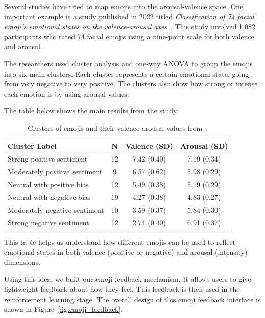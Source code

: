 Several studies have tried to map emojis into the arousal-valence space. One important example is a study published in 2022 titled \textit{Classification of 74 facial emoji’s emotional states on the valence-arousal axes}~\cite{kutsuzawa2022classification}. This study involved 1,082 participants who rated 74 facial emojis using a nine-point scale for both valence and arousal.

The researchers used cluster analysis and one-way ANOVA to group the emojis into six main clusters. Each cluster represents a certain emotional state, going from very negative to very positive. The clusters also show how strong or intense each emotion is by using arousal values.

The table below shows the main results from the study:

\begin{table}[h]
    \centering
    \begin{tabular}{|l|c|c|c|}
        \hline
        \textbf{Cluster Label} & \textbf{N} & \textbf{Valence (SD)} & \textbf{Arousal (SD)} \\
        \hline
        Strong positive sentiment & 12 & 7.42 (0.40) & 7.19 (0.34) \\
        Moderately positive sentiment & 9 & 6.57 (0.62) & 5.98 (0.29) \\
        Neutral with positive bias & 12 & 5.49 (0.38) & 5.19 (0.29)\\
        Neutral with negative bias & 19 & 4.27 (0.38) & 4.83 (0.27) \\
        Moderately negative sentiment & 10 & 3.59 (0.37) & 5.84 (0.30)  \\
        Strong negative sentiment & 12 & 2.74 (0.40) & 6.91 (0.37)  \\
        \hline
    \end{tabular}
    \caption{Clusters of emojis and their valence-arousal values from~\cite{kutsuzawa2022classification}.}
    \label{tab:emoji_clusters}
\end{table}

This table helps us understand how different emojis can be used to reflect emotional states in both valence (positive or negative) and arousal (intensity) dimensions.

Using this idea, we built our emoji feedback mechanism. It allows users to give lightweight feedback about how they feel. This feedback is then used in the reinforcement learning stage. The overall design of this emoji feedback interface is shown in Figure~\ref{fig:emoji_feedback}.

